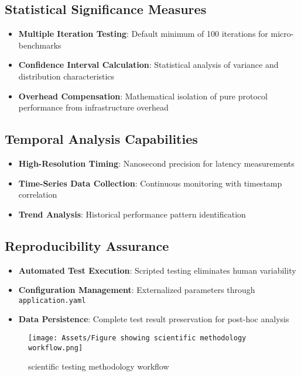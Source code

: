 \subsection{Statistical Significance Measures}

\begin{itemize}
    \item \textbf{Multiple Iteration Testing}: Default minimum of 100 iterations for micro-benchmarks
    \item \textbf{Confidence Interval Calculation}: Statistical analysis of variance and distribution characteristics
    \item \textbf{Overhead Compensation}: Mathematical isolation of pure protocol performance from infrastructure overhead
\end{itemize}

\subsection{Temporal Analysis Capabilities}

\begin{itemize}
    \item \textbf{High-Resolution Timing}: Nanosecond precision for latency measurements
    \item \textbf{Time-Series Data Collection}: Continuous monitoring with timestamp correlation
    \item \textbf{Trend Analysis}: Historical performance pattern identification
\end{itemize}

\subsection{Reproducibility Assurance}

\begin{itemize}
    \item \textbf{Automated Test Execution}: Scripted testing eliminates human variability
    \item \textbf{Configuration Management}: Externalized parameters through \texttt{application.yaml}
    \item \textbf{Data Persistence}: Complete test result preservation for post-hoc analysis
\end{itemize}

\begin{figure}[H]
    \centering
    \texttt{[image: Assets/Figure showing scientific methodology workflow.png]}
    \caption{scientific testing methodology workflow}
\end{figure}



